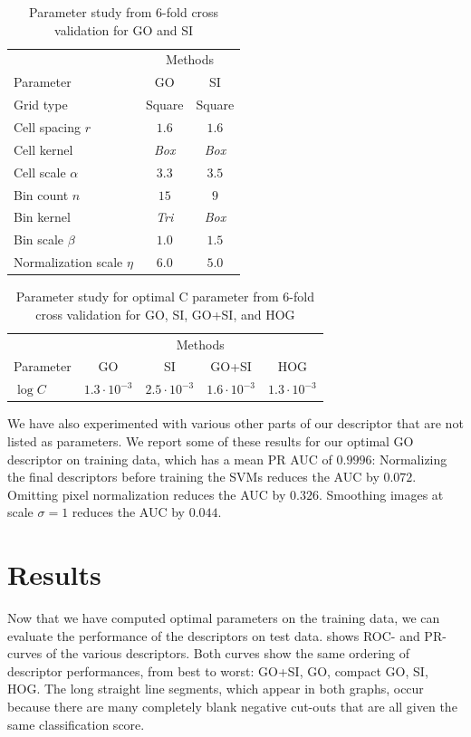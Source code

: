 \documentclass[thesis.tex]{subfiles}
\begin{document}
\begin{table}[tb]
\centering
\begin{tabular}{ l c c }
\toprule
{} & \multicolumn{2}{c}{Methods} \\
Parameter & GO & SI \\ \midrule
Grid type & Square & Square \\
Cell spacing $r$ & $1.6$ & $1.6$ \\
Cell kernel & \textit{Box} & \textit{Box} \\
Cell scale $\alpha$ & $3.3$ & $3.5$ \\
Bin count $n$ & $15$ & $9$ \\
Bin kernel & \textit{Tri} & \textit{Box} \\
Bin scale $\beta$ & $1.0$ & $1.5$ \\
Normalization scale $\eta$ & $6.0$ & $5.0$ \\
\bottomrule
\end{tabular}
\caption{Parameter study from 6-fold cross validation for GO and SI}
\label{fig:INRIAparamC}
\end{table}
%
\begin{table}[tb]
\centering
\begin{tabular}{ l c c c c }
\toprule
{} & \multicolumn{4}{c}{Methods} \\
Parameter & GO & SI & GO+SI & HOG \\ \midrule
$\log C$ & $1.3\cdot 10^{-3}$ & $2.5\cdot 10^{-3}$ & $1.6\cdot 10^{-3}$ & $1.3\cdot 10^{-3}$ \\
\bottomrule
\end{tabular}
\caption{Parameter study for optimal C parameter from 6-fold cross validation for GO, SI, GO+SI, and HOG}
\label{fig:INRIAparamC}
\end{table}
%
We have also experimented with various other parts of our descriptor that are not listed as parameters. We report some of these results for our optimal GO descriptor on training data, which has a mean PR AUC of $0.9996$: Normalizing the final descriptors before training the SVMs reduces the AUC by $0.072$. Omitting pixel normalization reduces the AUC by $0.326$. Smoothing images at scale $\sigma = 1$ reduces the AUC by $0.044$.
%
\section{Results}
%
Now that we have computed optimal parameters on the training data, we can evaluate the performance of the descriptors on test data.  shows ROC- and PR-curves of the various descriptors. Both curves show the same ordering of descriptor performances, from best to worst: GO+SI, GO, compact GO, SI, HOG. The long straight line segments, which appear in both graphs, occur because there are many completely blank negative cut-outs that are all given the same classification score.
\end{document}
